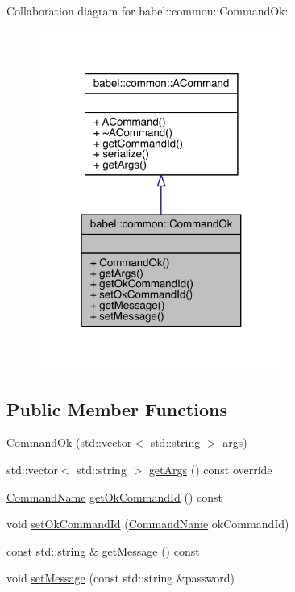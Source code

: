 Collaboration diagram for babel\+:\+:common\+:\+:Command\+Ok\+:\nopagebreak
\begin{figure}[H]
\begin{center}
\leavevmode
\includegraphics[width=229pt]{classbabel_1_1common_1_1_command_ok__coll__graph}
\end{center}
\end{figure}
\subsection*{Public Member Functions}
\begin{DoxyCompactItemize}
\item 
\mbox{\hyperlink{classbabel_1_1common_1_1_command_ok_a57b55058fd0267e7665b417337c3d93e}{Command\+Ok}} (std\+::vector$<$ std\+::string $>$ args)
\item 
std\+::vector$<$ std\+::string $>$ \mbox{\hyperlink{classbabel_1_1common_1_1_command_ok_a50c500fb74111c9e3b0b90a53fedc003}{get\+Args}} () const override
\item 
\mbox{\hyperlink{namespacebabel_1_1common_a2d31f246c776da6bf656bd71e86cbb2c}{Command\+Name}} \mbox{\hyperlink{classbabel_1_1common_1_1_command_ok_a730dd943b649f7570b6cb365cd40ddca}{get\+Ok\+Command\+Id}} () const
\item 
void \mbox{\hyperlink{classbabel_1_1common_1_1_command_ok_a6a68be469749258e63542ff368949330}{set\+Ok\+Command\+Id}} (\mbox{\hyperlink{namespacebabel_1_1common_a2d31f246c776da6bf656bd71e86cbb2c}{Command\+Name}} ok\+Command\+Id)
\item 
const std\+::string \& \mbox{\hyperlink{classbabel_1_1common_1_1_command_ok_ae70071d00f69cd1ed94ac1d20ec98840}{get\+Message}} () const
\item 
void \mbox{\hyperlink{classbabel_1_1common_1_1_command_ok_aa3b27ee553ae5c7cde2713c919600210}{set\+Message}} (const std\+::string \&password)
\end{DoxyCompactItemize}


